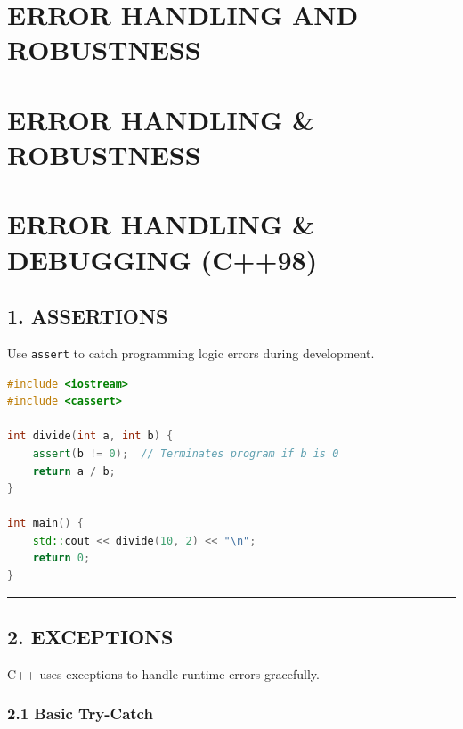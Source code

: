 \hypertarget{error-handling-and-robustness}{%
\chapter{ERROR HANDLING AND
ROBUSTNESS}\label{error-handling-and-robustness}}

\hypertarget{error-handling-robustness}{%
\chapter{ERROR HANDLING \& ROBUSTNESS}\label{error-handling-robustness}}

\hypertarget{error-handling-debugging-c98}{%
\chapter{ERROR HANDLING \& DEBUGGING
(C++98)}\label{error-handling-debugging-c98}}

\hypertarget{assertions}{%
\section{1. ASSERTIONS}\label{assertions}}

Use \passthrough{\lstinline!assert!} to catch programming logic errors
during development.

\begin{lstlisting}[language={C++}]
#include <iostream>
#include <cassert>

int divide(int a, int b) {
    assert(b != 0);  // Terminates program if b is 0
    return a / b;
}

int main() {
    std::cout << divide(10, 2) << "\n";
    return 0;
}
\end{lstlisting}

\begin{center}\rule{0.5\linewidth}{0.5pt}\end{center}

\hypertarget{exceptions}{%
\section{2. EXCEPTIONS}\label{exceptions}}

C++ uses exceptions to handle runtime errors gracefully.

\hypertarget{basic-try-catch}{%
\subsection{2.1 Basic Try-Catch}\label{basic-try-catch}}

